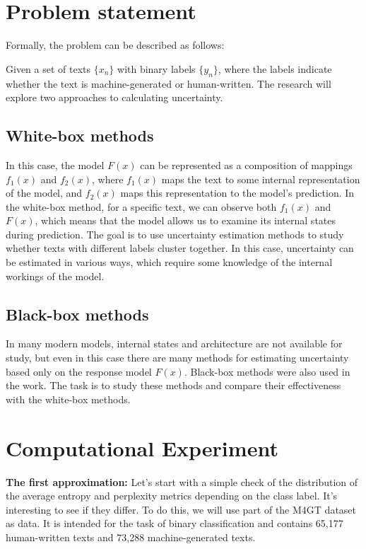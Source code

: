 \documentclass[a4paper, 12pt]{article}
\begin{document}
\section{Problem statement}

Formally, the problem can be described as follows:  

Given a set of texts \(\{x_n\}\) with binary labels \(\{y_n\}\), where the labels indicate whether the text is machine-generated or human-written. The research will explore two approaches to calculating uncertainty.

\subsection {White-box methods}  
In this case, the model \(F(x)\) can be represented as a composition of mappings \(f_1(x)\) and \(f_2(x)\), where \(f_1(x)\) maps the text to some internal representation of the model, and \(f_2(x)\) maps this representation to the model's prediction. In the white-box method, for a specific text, we can observe both \(f_1(x)\) and \(F(x)\), which means that the model allows us to examine its internal states during prediction. The goal is to use uncertainty estimation methods to study whether texts with different labels cluster together. In this case, uncertainty can be estimated in various ways\citep{Polygraph}, which require some knowledge of the internal workings of the model.  

\subsection {Black-box methods}   
In many modern models, internal states and architecture are not available for study, but even in this case there are many methods for estimating uncertainty based only on the response model \(F(x)\). Black-box methods were also used in the work\citep{Polygraph}. The task is to study these methods and compare their effectiveness with the white-box methods.

\section{Computational Experiment}

\textbf{The first approximation:} Let's start with a simple check of the distribution of the average entropy and perplexity metrics depending on the class label. It's interesting to see if they differ.  To do this, we will use part of the M4GT\citep{wang2024m4gt} dataset as data. It is intended for the task of binary classification and contains 65,177 human-written texts and 73,288 machine-generated texts.
\end{document}
